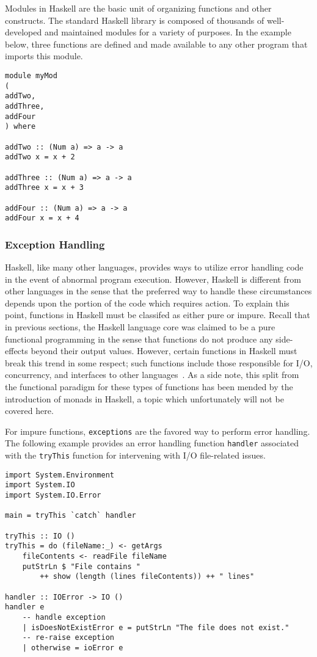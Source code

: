 \documentclass[titlepage,12pt]{article}
\begin{document}
Modules in Haskell are the basic unit of organizing functions and other constructs.  The standard Haskell library
is composed of thousands of well-developed and maintained modules for a variety of purposes.  In the example below,
three functions are defined and made available to any other program that imports this module.

\begin{verbatim}
module myMod 
( 
addTwo,
addThree,
addFour
) where

addTwo :: (Num a) => a -> a
addTwo x = x + 2

addThree :: (Num a) => a -> a
addThree x = x + 3

addFour :: (Num a) => a -> a
addFour x = x + 4
\end{verbatim}
\subsubsection{Exception Handling}

Haskell, like many other languages, provides ways to utilize error handling code
in the event of abnormal program execution.  However, Haskell is
different from other languages in the sense that the preferred way to handle
these circumstances depends upon the portion of the code which requires action.
To explain this point, functions in Haskell must be classifed as either pure
or impure.  Recall that in previous sections, the Haskell language core was
claimed to be a pure functional programming in the sense that functions do
not produce any side-effects beyond their output values.  However, certain
functions in Haskell must break this trend in some respect; such functions include
those responsible for I/O, concurrency, and interfaces to other languages~\cite{haskell-awkward-squad}.
As a side note, this split from the functional paradigm for these types of functions has
been mended by the introduction of monads in Haskell, a topic which unfortunately will not be covered here.

For impure functions, \texttt{exceptions} are the favored way to perform error handling.
The following example provides an error handling function \texttt{handler} associated with the
\texttt{tryThis} function for intervening with I/O file-related issues.

\begin{verbatim}
import System.Environment  
import System.IO  
import System.IO.Error  
      
main = tryThis `catch` handler  
                  
tryThis :: IO ()  
tryThis = do (fileName:_) <- getArgs  
    fileContents <- readFile fileName  
    putStrLn $ "File contains "
        ++ show (length (lines fileContents)) ++ " lines"  
      
handler :: IOError -> IO ()  
handler e 
    -- handle exception
    | isDoesNotExistError e = putStrLn "The file does not exist."  
    -- re-raise exception
    | otherwise = ioError e  
\end{verbatim}
\end{document}
